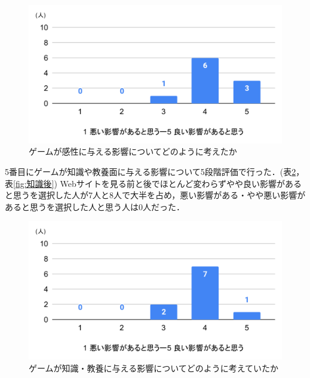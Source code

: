 \documentclass[12pt,a4j,titlepage]{ltjsarticle}
\begin{document}
\begin{figure}[H]
 \begin{center}
  \includegraphics[keepaspectratio, scale=0.5]{感性後.pdf}
 \end{center}
 \caption{ゲームが感性に与える影響についてどのように考えたか}
 \label{fig:感性後}
\end{figure}

5番目にゲームが知識や教養面に与える影響について5段階評価で行った．(表\ref{fig:知識前}，表\ref{fig:知識後})
Webサイトを見る前と後でほとんど変わらずやや良い影響があると思うを選択した人が7人と8人で大半を占め，悪い影響がある・やや悪い影響があると思うを選択した人と思う人は0人だった．

\begin{figure}[H]
 \begin{center}
  \includegraphics[keepaspectratio, scale=0.5]{知識前.pdf}
 \end{center}
 \caption{ゲームが知識・教養に与える影響についてどのように考えていたか}
 \label{fig:知識前}
\end{figure}
\end{document}
